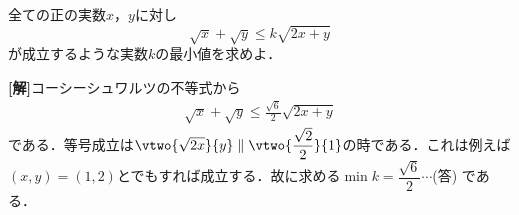 \documentclass[a4j]{jarticle}
\title{}
\begin{document}

\begin{oframed}
全ての正の実数$x$，$y$に対し
\[ \sqrt{x}+\sqrt{y}\le k\sqrt{2x+y} \]
が成立するような実数$k$の最小値を求めよ．
\end{oframed}

\setlength{\columnseprule}{0.4pt}
\begin{multicols}{2}
{\bf[解]}コーシーシュワルツの不等式から
\begin{align*}
\sqrt{x}+\sqrt{y}\le\frac{\sqrt{6}}{2}\sqrt{2x+y}
\end{align*}
である．等号成立は$\vtwo{\sqrt{2x}}{y}\parallel\vtwo{\dfrac{\sqrt{2}}{2}}{1}$の時である．これは例えば
$(x,y)=(1,2)$とでもすれば成立する．故に求める$\min k=\dfrac{\sqrt{6}}{2}\cdots$(答) である．
\newpage
\end{multicols}
\end{document}
